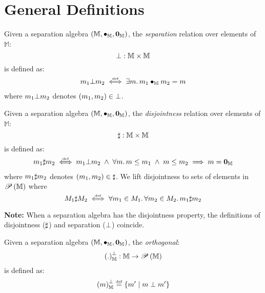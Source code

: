 \section*{General Definitions}
%
\begin{definition}[Separation]
Given a separation algebra $\left(\mathbb{M}, \bullet_{\mathbb{M}}, \mathbf{0}_{\mathbb{M}} \right)$, the \emph{separation} relation over elements of $\mathbb{M}$:
%
\[
\bot : \mathbb{M} \times \mathbb{M}
\]
%
is defined as:
%
\[
\begin{array}{l}
	m_1 \bot m_2 \mathrel{\stackrel{\smash{\scriptscriptstyle{\mathrm{def}}}}{\iff}} \exists m.\, m_1 \bullet_{\mathbb{M}} m_2 = m 
\end{array}
\]
%
where $m_1 \bot m_2$ denotes $(m_1, m_2) \in \bot$. 
\end{definition}
%
%
\begin{definition}[Disjointness]
Given a separation algebra $\left(\mathbb{M}, \bullet_{\mathbb{M}}, \mathbf{0}_{\mathbb{M}} \right)$, the \emph{disjointness} relation over elements of $\mathbb{M}$:
%
\[
\sharp : \mathbb{M} \times \mathbb{M}
\]
%
is defined as:
%
\[
\begin{array}{l}
	m_1 \sharp m_2 \mathrel{\stackrel{\smash{\scriptscriptstyle{\mathrm{def}}}}{\iff}} m_1 \bot m_2 \;\land\; \forall m.\, m \leq m_1 \;\land\; m \leq m_2 \implies m = \mathbf{0}_{\mathbb{M}}
\end{array}
\]
%
where $m_1 \sharp m_2$ denotes $(m_1, m_2) \in \sharp$. We lift disjointness to sets of elements in $\mathscr{P}\left(\mathbb{M} \right)$ where
%
\[
	M_1 \sharp M_2 \mathrel{\stackrel{\smash{\scriptscriptstyle{\mathrm{def}}}}{\iff}} \forall m_1 \in M_1.\,\forall m_2 \in M_2.\, m_1 \sharp m_2
\]
%
\end{definition}
%
%
\noindent\textbf{Note: } When a separation algebra has the disjointness property, the definitions of disjointness ($\sharp$) and separation ($\bot$) coincide.
%
%
\begin{definition}[Orthogonal]
Given a separation algebra $\left(\mathbb{M}, \bullet_{\mathbb{M}}, \mathbf{0}_{\mathbb{M}} \right)$, the \emph{orthogonal}:
%
\[
\left( .\right)_{\mathbb{M}}^{\bot} : \mathbb{M} \rightarrow \mathscr{P}\left(\mathbb{M} \right)
\]
%
is defined as:
%
\[
	\left( m\right)_{\mathbb{M}}^{\bot} \mathrel{\stackrel{\smash{\scriptscriptstyle{\mathrm{def}}}}{=}} \left\{ m' \;|\; m \;\bot\; m'\right\}
\]
%
%
\end{definition}
